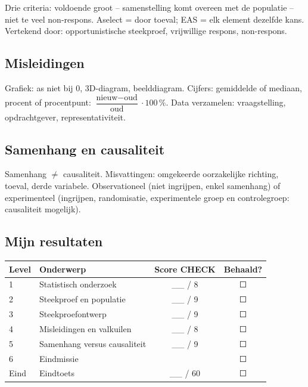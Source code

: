 Drie criteria: voldoende groot – samenstelling komt overeen met de populatie – niet te veel non-respons. Aselect = door toeval; EAS = elk element dezelfde kans. Vertekend door: opportunistische steekproef, vrijwillige respons, non-respons.

\subsection*{Misleidingen}

Grafiek: as niet bij 0, 3D-diagram, beelddiagram. Cijfers: gemiddelde of mediaan, procent of procentpunt: $\dfrac{\text{nieuw}-\text{oud}}{\text{oud}}\cdot 100\,\%$. Data verzamelen: vraagstelling, opdrachtgever, representativiteit.

\subsection*{Samenhang en causaliteit}

Samenhang $\neq$ causaliteit. Misvattingen: omgekeerde oorzakelijke richting, toeval, derde variabele. Observationeel (niet ingrijpen, enkel samenhang) of experimenteel (ingrijpen, randomisatie, experimentele groep en controlegroep: causaliteit mogelijk).

\subsection*{Mijn resultaten}

\begin{tabular}{llcc}
\hline
Level & Onderwerp & Score CHECK & Behaald? \\
\hline
1 & Statistisch onderzoek & \_\_ / 8 & ☐ \\
2 & Steekproef en populatie & \_\_ / 9 & ☐ \\
3 & Steekproefontwerp & \_\_ / 9 & ☐ \\
4 & Misleidingen en valkuilen & \_\_ / 8 & ☐ \\
5 & Samenhang versus causaliteit & \_\_ / 9 & ☐ \\
6 & Eindmissie & & ☐ \\
Eind & Eindtoets & \_\_ / 60 & ☐ \\
\hline
\end{tabular}

